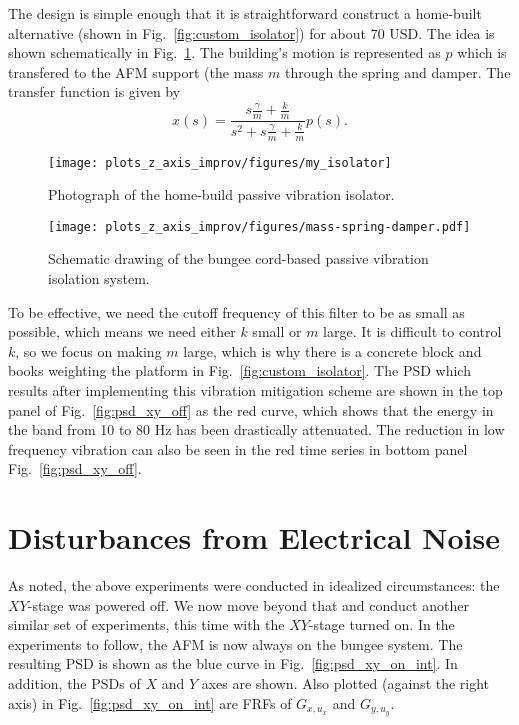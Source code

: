 The design is simple enough that it is straightforward construct a home-built alternative (shown in Fig.~\ref{fig:custom_isolator}) for about 70 USD. The idea is shown schematically in Fig.~\ref{fig:isolation_lpf}. The building's motion is represented as $p$ which is transfered to the AFM support (the mass $m$ through the spring and damper. The transfer function is given by
\begin{equation}
  x(s) = \frac{s\frac{\gamma}{m} + \frac{k}{m}}{s^2 + s\frac{\gamma}{m} + \frac{k}{m}}p(s).
  \label{eqn:vib_lpf}
\end{equation}

\begin{figure}[t!]
  \begin{minipage}[t]{.46\textwidth}
    \centering
    \texttt{[image: plots\_z\_axis\_improv/figures/my\_isolator]}
    \caption{Photograph of the home-build passive vibration isolator.}
    \label{fig:custom_isolator}
  \end{minipage}
\hfill
\begin{minipage}[t]{.46\textwidth}
  \centering
  \texttt{[image: plots\_z\_axis\_improv/figures/mass-spring-damper.pdf]}
  \caption{Schematic drawing of the bungee cord-based passive vibration
    isolation system.}
  \label{fig:isolation_lpf}
\end{minipage}
\end{figure}
To be effective, we need the cutoff frequency of this filter to be as small as possible, which means we need either $k$ small or $m$ large. It is difficult to control $k$, so we focus on making $m$ large, which is why there is a concrete block and books weighting the platform in Fig.~\ref{fig:custom_isolator}. The PSD which results after implementing this vibration mitigation scheme are shown in the top panel of Fig.~\ref{fig:psd_xy_off} as the red curve, which shows that the energy in the band from 10 to 80 Hz has been drastically attenuated. The reduction in low frequency vibration can also be seen in the red time series in bottom panel Fig.~\ref{fig:psd_xy_off}.

\section{Disturbances from Electrical Noise}
As noted, the above experiments were conducted in idealized circumstances: the $XY$-stage was powered off. We now move beyond that and conduct another similar set of experiments, this time with the $XY$-stage turned on. In the experiments to follow, the AFM is now always on the bungee system. The resulting PSD is shown as the blue curve in Fig.~\ref{fig:psd_xy_on_int}. In addition, the PSDs of $X$ and $Y$ axes are shown. 
Also plotted (against the right axis) in Fig.~\ref{fig:psd_xy_on_int} are FRFs of $G_{x,u_x}$ and $G_{y,u_y}$.

